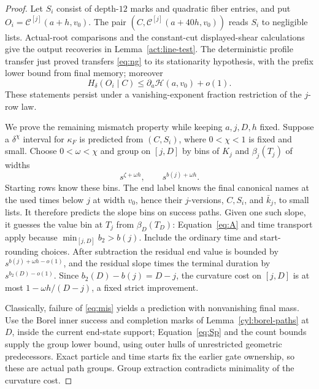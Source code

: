 \begin{proof}
Let $S_i$ consist of depth-$12$ marks and quadratic fiber entries,
and put $O_i=\mathcal C^{[j]}(a+h,v_0)$.
The pair $(C,\mathcal C^{[j]}(a+40h,v_0))$ reads $S_i$ to
negligible lists.  Actual-root comparisons and the constant-cut
displayed-shear calculations give the output recoveries in
Lemma~\ref{act:line-test}.  The deterministic profile transfer
just proved transfers \eqref{eq:ng} to its stationarity hypothesis,
with the prefix lower bound from final memory; moreover
\[
 H_\delta(O_i\mid C)\le\partial_a\mathcal H(a,v_0)+o(1).
\]
These statements persist under a vanishing-exponent fraction
restriction of the $j$-row law.

We prove the remaining mismatch property while keeping $a,j,D,h$
fixed.  Suppose a $\delta^\chi$ interval for $\kappa_F$ is predicted
from $(C,S_i)$, where $0<\chi<1$ is fixed and small.  Choose
$0<\omega<\chi$ and group on $[j,D]$ by bins of $K_j$ and
$\beta_j(T_j)$ of widths
\[
 s^{\zeta+\omega h},\qquad s^{b(j)+\omega h}.
\]
Starting rows know these bins.  The end label knows the final
canonical names at the used times below $j$ at width $v_0$, hence
their $j$-versions, $C,S_i$, and $\bar k_j$, to small lists.
It therefore predicts the slope bins on success paths.  Given
one such slope, it guesses the value bin at $T_j$ from
$\beta_D(T_D)$: Equation~\eqref{eq:A} and time transport apply
because $\min_{[j,D]}b_2>b(j)$.  Include the ordinary time and
start-rounding choices.  After subtraction the residual end value
is bounded by $s^{b(j)+\omega h-o(1)}$, and the residual slope
times the terminal duration by $s^{b_2(D)-o(1)}$.
Since $b_2(D)-b(j)=D-j$, the curvature cost on $[j,D]$ is at most
$1-\omega h/(D-j)$, a fixed strict improvement.

Classically, failure of \eqref{eq:mis} yields a prediction with
nonvanishing final mass.  Use the Borel inner success and completion
marks of Lemma~\ref{cyl:borel-paths} at $D$, inside the current
end-state support;
Equation~\eqref{eq:Sp} and the count bounds supply the group lower
bound, using outer hulls of unrestricted geometric predecessors.
Exact particle and time starts fix the earlier gate
ownership, so these are actual path groups.  Group extraction
contradicts minimality of the curvature cost.


\end{proof}

